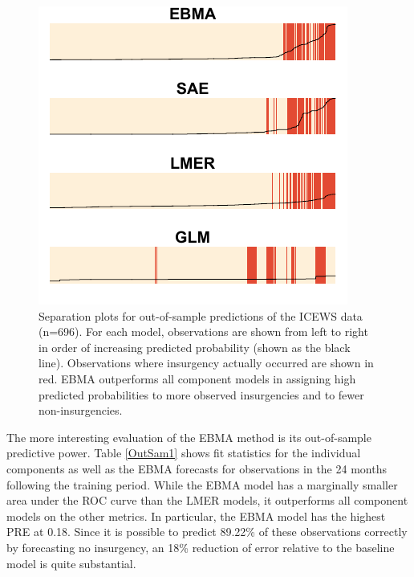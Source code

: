 \documentclass[pdftex,12pt,fullpage,oneside]{amsart}
\begin{document}
\begin{figure}
  \caption{\footnotesize Separation plots for out-of-sample
    predictions of the ICEWS data (n=696). For each model,
    observations are shown from left to right in order of increasing
    predicted probability (shown as the black line). Observations
    where insurgency actually occurred are shown in red. EBMA
    outperforms all component models in assigning high predicted
    probabilities to more observed insurgencies and to fewer
    non-insurgencies.}
\label{OutSam1sep}
\begin{center}
\includegraphics[]{OutSampleNew.pdf}
\end{center}
\end{figure}




The more interesting evaluation of the EBMA method is its
out-of-sample predictive power. Table \ref{OutSam1} shows fit
statistics for the individual components as well as the EBMA forecasts
for observations in the 24 months following the training period.
While the EBMA model has a marginally smaller area under the ROC curve
than the LMER models, it outperforms all component models on the other
metrics. In particular, the EBMA model has the highest PRE at 0.18.
Since it is possible to predict 89.22\% of these observations
correctly by forecasting no insurgency, an 18\% reduction of error
relative to the baseline model is quite substantial.
\end{document}
